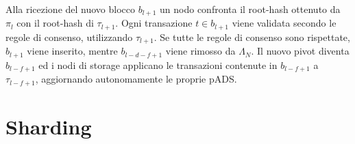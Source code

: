 Alla ricezione del nuovo blocco $b_{l+1}$ un nodo confronta il root-hash ottenuto da $\pi_l$ con il root-hash di $\tau_{l+1}$.  Ogni transazione $t \in b_{l+1}$ viene validata secondo le regole di consenso, utilizzando $\tau_{l+1}$. Se tutte le regole di consenso sono rispettate, $b_{l+1}$ viene inserito, mentre $b_{l-d-f+1}$ viene rimosso da $\Lambda_N$. Il nuovo pivot diventa $b_{l-f+1}$ ed i nodi di storage applicano le transazioni contenute in $b_{l-f+1}$ a $\tau_{l-f+1}$, aggiornando autonomamente le proprie pADS.

\section{Sharding}